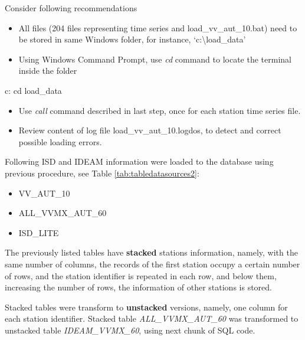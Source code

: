 \documentclass[12pt,oneside]{reedthesis}
\newenvironment{Shaded}{\begin{snugshade}}{\end{snugshade}}
\newcommand{\BuiltInTok}[1]{#1}
\newcommand{\ExtensionTok}[1]{#1}
\newcommand{\NormalTok}[1]{#1}
\providecommand{\tightlist}{%
  \setlength{\itemsep}{0pt}\setlength{\parskip}{0pt}}
\begin{document}
Consider following recommendations
\begin{itemize}
\tightlist
\item
  All files (204 files representing time series and load\_vv\_aut\_10.bat) need to be stored in same Windows folder, for instance, `c:\textbackslash load\_data'
\item
  Using Windows Command Prompt, use \emph{cd} command to locate the terminal inside the folder
\end{itemize}
\scriptsize

\vspace{0.4cm}
\begin{Shaded}
\begin{Highlighting}[]
        \ExtensionTok{c}\NormalTok{:}
        \BuiltInTok{cd}\NormalTok{ load_data}
\end{Highlighting}
\end{Shaded}
\normalsize
\begin{itemize}
\tightlist
\item
  Use \emph{call} command described in last step, once for each station time series file.
\item
  Review content of log file load\_vv\_aut\_10.logdos, to detect and correct possible loading errors.
\end{itemize}
Following ISD and IDEAM information were loaded to the database using previous procedure, see Table \ref{tab:tabledatasources2}:
\begin{itemize}
\tightlist
\item
  VV\_AUT\_10
\item
  ALL\_VVMX\_AUT\_60
\item
  ISD\_LITE
\end{itemize}
The previously listed tables have \textbf{stacked} stations information, namely, with the same number of columns, the records of the first station occupy a certain number of rows, and the station identifier is repeated in each row, and below them, increasing the number of rows, the information of other stations is stored.

Stacked tables were transform to \textbf{unstacked} versions, namely, one column for each station identifier. Stacked table \emph{ALL\_VVMX\_AUT\_60} was transformed to unstacked table \emph{IDEAM\_VVMX\_60}, using next chunk of SQL code.

\scriptsize
\end{document}

